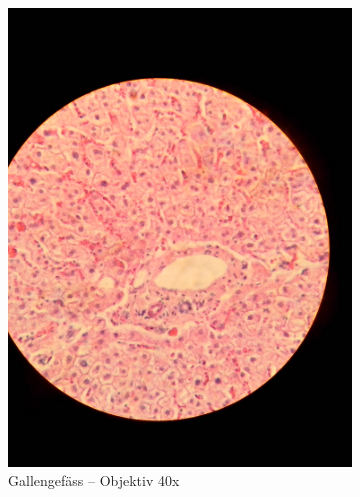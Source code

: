 \begin{figure}[h!]
\begin{subfigure}[b]{0.3\textwidth}
		\includegraphics[width=1\textwidth]{../images/08_human_liver.jpg}
		\caption{Gallengefäss -- Objektiv 40x}
		\label{fig:08_human_liver}
	\end{subfigure}
	\begin{subfigure}[b]{0.3\textwidth}

\end{subfigure}
\end{figure}
